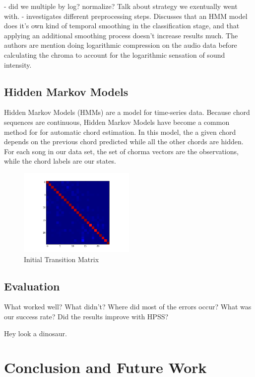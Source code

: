 \documentclass{article}
\begin{document}
- did we multiple by log? normalize? Talk about strategy we exentually went with.
- \cite{Jiang:22} investigates different preprocessing steps. Discusses that
an HMM model does it's own kind of temporal smoothing in the classification
stage, and that applying an additional smoothing process doesn't increase results much.
The authors are mention doing logarithmic compression on the audio data before
calculating the chroma to account for the logarithmic sensation of sound intensity.

\subsection{Hidden Markov Models}

Hidden Markov Models (HMMs) are a model for time-series data. Because chord sequences are continuous,  Hidden Markov Models have become a common method for for automatic chord estimation. In this model, the a given chord depends on the previous chord predicted while all the other chords are hidden. For each song in our data set, the set of chorma vectors are the observations, while the chord labels are our states. 

\begin{figure}
   \centering
   \includegraphics[width=0.5\textwidth]{trans-h.png}
   \caption{Initial Transition Matrix}
   \label{fig:transmath}
\end{figure}

\subsection{Evaluation}


What worked well? What didn't? Where did most of the errors occur?
What was our success rate? Did the results improve with HPSS?

Hey look a dinosaur.

\section{Conclusion and Future Work}
\end{document}
